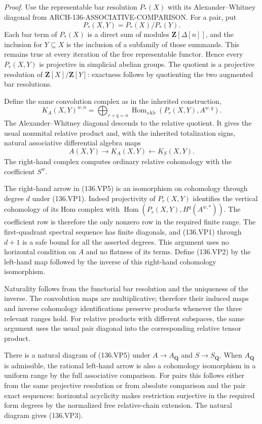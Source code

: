 \emph{Proof.}
Use the representable bar resolution \(P_*(X)\) with its
Alexander--Whitney diagonal from
ARCH-136-ASSOCIATIVE-COMPARISON. For a pair, put
\[
                  P_*(X,Y)=P_*(X)/P_*(Y).
 \]
Each bar term of \(P_*(X)\) is a direct sum of modules
\(\mathbf Z[\Delta[n]]\), and the inclusion for \(Y\subseteq X\)
is the inclusion of a subfamily of those summands. This remains
true at every iteration of the free representable functor.
Hence every \(P_r(X,Y)\) is projective in simplicial abelian
groups. The quotient is a projective resolution of
\(\mathbf Z[X]/\mathbf Z[Y]\): exactness follows by quotienting
the two augmented bar resolutions.

Define the same convolution complex as in the inherited
construction,
\[
 K_A(X,Y)^{w,n}
 =\bigoplus_{r+q=n}
       \operatorname{Hom}_{s\mathrm{Ab}}
                (P_r(X,Y),A^{w,q}).
 \tag{136.VP4}
\]
The Alexander--Whitney diagonal descends to the relative
quotient. It gives the usual nonunital relative product and,
with the inherited totalization signs, natural associative
differential algebra maps
\[
 A(X,Y)\longrightarrow K_A(X,Y)
                         \longleftarrow K_{\underline S}(X,Y).
 \tag{136.VP5}
\]
The right-hand complex computes ordinary relative cohomology
with the coefficient \(S^w\).

The right-hand arrow in (136.VP5) is an isomorphism on
cohomology through degree \(d\) under (136.VP1).
Indeed projectivity of \(P_r(X,Y)\) identifies the vertical
cohomology of its Hom complex with
\(\operatorname{Hom}(P_r(X,Y),H^q(A^{w,*}))\).
The coefficient row is therefore the only nonzero row in
the required finite range. The first-quadrant spectral sequence
has finite diagonals, and (136.VP1) through \(d+1\) is a safe
bound for all the asserted degrees. This argument uses no
horizontal condition on \(A\) and no flatness of its terms.
Define (136.VP2) by the left-hand map followed by the inverse
of this right-hand cohomology isomorphism.

Naturality follows from the functorial bar resolution and
the uniqueness of the inverse. The convolution maps are
multiplicative; therefore their induced maps and inverse
cohomology identifications preserve products whenever the
three relevant ranges hold. For relative products with
different subspaces, the same argument uses the usual pair
diagonal into the corresponding relative tensor product.

There is a natural diagram of (136.VP5) under
\(A\to A_{\mathbf Q}\) and \(S\to S_{\mathbf Q}\).
When \(A_{\mathbf Q}\) is admissible, the rational left-hand
arrow is also a cohomology isomorphism in a uniform range
by the full associative comparison. For pairs this follows
either from the same projective resolution or from absolute
comparison and the pair exact sequences: horizontal
acyclicity makes restriction surjective in the required
form degrees by the normalized free relative-chain extension.
The natural diagram gives (136.VP3).

